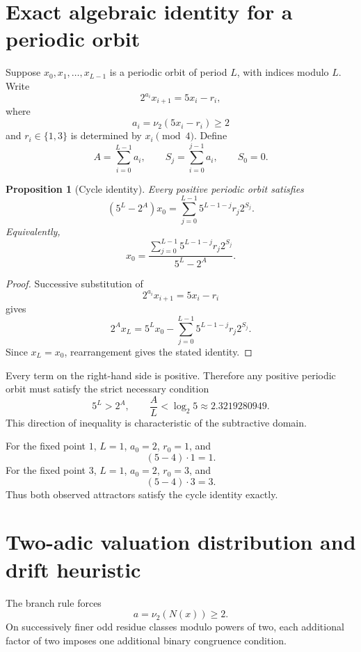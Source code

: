 \documentclass[11pt]{article}
\newtheorem{proposition}{Proposition}
\newcommand{\vTwo}{\nu_2}
\begin{document}
\section{Exact algebraic identity for a periodic orbit}

Suppose $x_0,x_1,\ldots,x_{L-1}$ is a periodic orbit of period $L$, with indices modulo $L$. Write
\begin{equation}
2^{a_i}x_{i+1}=5x_i-r_i,
\end{equation}
where
\[
a_i=\vTwo(5x_i-r_i)\ge2
\]
and $r_i\in\{1,3\}$ is determined by $x_i\pmod4$. Define
\[
A=\sum_{i=0}^{L-1}a_i,\qquad
S_j=\sum_{i=0}^{j-1}a_i,\qquad S_0=0.
\]

\begin{proposition}[Cycle identity]
Every positive periodic orbit satisfies
\begin{equation}
(5^L-2^A)x_0=
\sum_{j=0}^{L-1}5^{L-1-j}r_j2^{S_j}.
\end{equation}
Equivalently,
\begin{equation}
x_0=
\frac{\displaystyle\sum_{j=0}^{L-1}5^{L-1-j}r_j2^{S_j}}
{5^L-2^A}.
\end{equation}
\end{proposition}

\begin{proof}
Successive substitution of
\[
2^{a_i}x_{i+1}=5x_i-r_i
\]
gives
\[
2^A x_L=
5^Lx_0-
\sum_{j=0}^{L-1}5^{L-1-j}r_j2^{S_j}.
\]
Since $x_L=x_0$, rearrangement gives the stated identity.
\end{proof}

Every term on the right-hand side is positive. Therefore any positive periodic orbit must satisfy the strict necessary condition
\begin{equation}
5^L>2^A,\qquad
\frac{A}{L}<\log_2 5\approx2.3219280949.
\end{equation}
This direction of inequality is characteristic of the subtractive domain.

For the fixed point $1$, $L=1$, $a_0=2$, $r_0=1$, and
\[
(5-4)\cdot1=1.
\]
For the fixed point $3$, $L=1$, $a_0=2$, $r_0=3$, and
\[
(5-4)\cdot3=3.
\]
Thus both observed attractors satisfy the cycle identity exactly.

\section{Two-adic valuation distribution and drift heuristic}

The branch rule forces
\[
a=\vTwo(N(x))\ge2.
\]
On successively finer odd residue classes modulo powers of two, each additional factor of two imposes one additional binary congruence condition.
\end{document}
